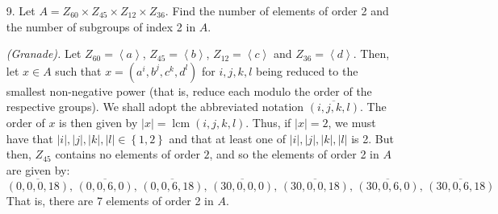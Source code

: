 \documentclass[10pt]{article}
\begin{document}
\begin{itemize}
\begin{proof}
These are the invariant factor decomposition representations of these
abelian groups, and by the fundamental theorem of finitely generated
Abelian groups we know that these are unique and hence the second
two groups are not isomorphic to each other or the prior groups.
\end{proof}

\item [9.] Let $A=Z_{60}\times Z_{45}\times Z_{12}\times Z_{36}$. Find
the number of elements of order 2 and the number of subgroups of index
2 in $A$.

\emph{(Granade).}  Let $Z_{60}=\left\langle a\right\rangle $,
$Z_{45}=\left\langle b\right\rangle $, $Z_{12}=\left\langle
  c\right\rangle $ and $Z_{36}=\left\langle d\right\rangle $.  Then,
let $x\in A$ such that $x=\left(a^{i},b^{j},c^{k},d^{l}\right)$ for
$i,j,k,l$ being reduced to the smallest non-negative power (that is,
reduce each modulo the order of the respective groups). We shall adopt
the abbreviated notation $\overline{\left(i,j,k,l\right)}$.  The order
of $x$ is then given by
$\left|x\right|=\operatorname{lcm}\left(i,j,k,l\right)$.  Thus, if
$\left|x\right|=2$, we must have that
$\left|i\right|,\left|j\right|,\left|k\right|,\left|l\right|\in\left\{
  1,2\right\} $ and that at least one of
$\left|i\right|,\left|j\right|,\left|k\right|,\left|l\right|$ is
2. But then, $Z_{45}$ contains no elements of order $2$, and so the
elements of order 2 in $A$ are given by:\[
\overline{\left(0,0,0,18\right)},\,\overline{\left(0,0,6,0\right)},\,\overline{\left(0,0,6,18\right)},\,\overline{\left(30,0,0,0\right)},\,\overline{\left(30,0,0,18\right)},\,\overline{\left(30,0,6,0\right)},\,\overline{\left(30,0,6,18\right)}\]
That is, there are 7 elements of order 2 in $A$.


\end{itemize}
\end{document}
